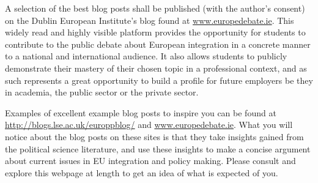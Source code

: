 	A selection of the best blog posts shall be published (with the author's consent) on the Dublin European Institute's blog found at \url{www.europedebate.ie}. This widely read and highly visible platform provides the opportunity for students to contribute to the public debate about European integration in a concrete manner to a national and international audience. It also allows students to publicly demonstrate their mastery of their chosen topic in a professional context, and as such represents a great opportunity to build a profile for future employers be they in academia, the public sector or the private sector. 

	Examples of excellent example blog posts to inspire you can be found at \url{http://blogs.lse.ac.uk/europpblog/} and \url{www.europedebate.ie}. What you will notice about the blog posts on these sites is that they take insights gained from the political science literature, and use these insights to make a concise argument about current issues in EU integration and policy making. Please consult and explore this webpage at length to get an idea of what is expected of you.



